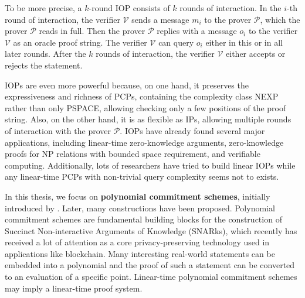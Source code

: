 To be more precise, a $k$-round IOP consists of $k$ rounds of interaction. In the $i$-th round of interaction, the verifier $\mathcal{V}$ sends a message $m_i$ to the prover $\mathcal{P}$, which the prover $\mathcal{P}$ reads in full. 
Then the prover $\mathcal{P}$ replies with a message $o_i$ to the verifier $\mathcal{V}$ as an oracle proof string.
The verifier $\mathcal{V}$ can query $o_i$ either in this or in all later rounds. 
After the $k$ rounds of interaction, the verifier $\mathcal{V}$ either accepts or rejects the statement.


IOPs are even more powerful because, on one hand, it preserves the expressiveness and richness of PCPs, containing the complexity class NEXP rather than only PSPACE, allowing checking only a few positions of the proof string. Also, on the other hand, it is as flexible as IPs, allowing multiple rounds of interaction with the prover $\mathcal{P}$. IOPs have already found several major applications, including linear-time zero-knowledge arguments, zero-knowledge proofs for NP relations with bounded space requirement, and verifiable computing.
Additionally, lots of researchers have tried to build linear IOPs while any linear-time PCPs with non-trivial query complexity seems not to exists.


In this thesis, we focus on \textbf{polynomial commitment schemes}, 
initially introduced by \cite{DBLP:conf/asiacrypt/KateZG10}.
Later, many constructions 
\cite{DBLP:conf/sp/TomescuCZAPGD20} 
\cite{DBLP:journals/iacr/YurekLFKM21} 
\cite{277222}
have been proposed.
Polynomial commitment schemes are fundamental building blocks for the construction of Succinct Non-interactive Arguments of Knowledge (SNARks), 
which recently has received a lot of attention as a core privacy-preserving technology used in applications like blockchain. Many interesting real-world statements can be embedded into a polynomial and the proof of such a statement can be converted to an evaluation of a specific point. Linear-time polynomial commitment schemes may imply a linear-time proof system.

